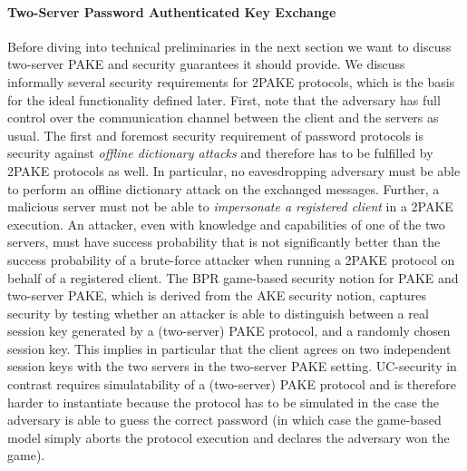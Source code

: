 \paragraph{Two-Server Password Authenticated Key Exchange}
Before diving into technical preliminaries in the next section we want to discuss two-server PAKE and security guarantees it should provide.
We discuss informally several security requirements for 2PAKE protocols, which is the basis for the ideal functionality \FTWOPAKE defined later.
First, note that the adversary has full control over the communication channel between the client and the servers as usual.
The first and foremost security requirement of password protocols is security against \emph{offline dictionary attacks} and therefore has to be fulfilled by 2PAKE protocols as well.
In particular, no eavesdropping adversary must be able to perform an offline dictionary attack on the exchanged messages.
Further, a malicious server must not be able to \emph{impersonate a registered client} in a 2PAKE execution.
An attacker, even with knowledge and capabilities of one of the two servers, must have success probability that is not significantly better than the success probability of a brute-force attacker when running a 2PAKE protocol on behalf of a registered client.
The BPR game-based security notion for PAKE and two-server PAKE, which is derived from the AKE security notion, captures security by testing whether an attacker is able to distinguish between a real session key generated by a (two-server) PAKE protocol, and a randomly chosen session key.
This implies in particular that the client agrees on two independent session keys with the two servers in the two-server PAKE setting.
UC-security in contrast requires simulatability of a (two-server) PAKE protocol and is therefore harder to instantiate because the protocol has to be simulated in the case the adversary is able to guess the correct password (in which case the game-based model simply aborts the protocol execution and declares the adversary won the game).


